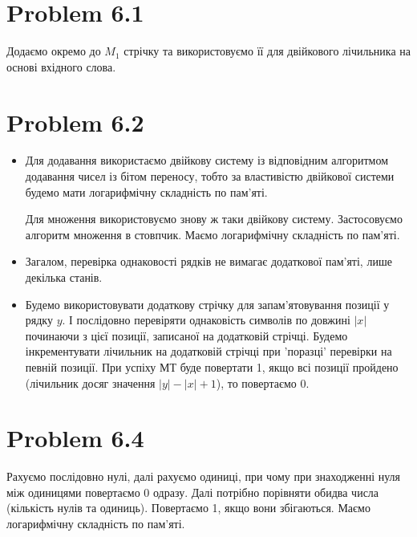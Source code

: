 \documentclass[12pt,letterpaper]{article}
\begin{document}
\section{Problem 6.1}
Додаємо окремо до $M_1$ стрічку та використовуємо її для двійкового лічильника на основі вхідного слова.

\section{Problem 6.2}
\begin{itemize}
    \item Для додавання використаємо двійкову систему із відповідним алгоритмом додавання чисел
із бітом переносу, тобто за властивістю двійкової системи будемо мати логарифмічну складність
по пам'яті.

Для множення використовуємо знову ж таки двійкову систему. Застосовуємо алгоритм множення
 в стовпчик. Маємо логарифмічну складність по пам'яті.
 \item  Загалом, перевірка однаковості рядків не вимагає додаткової пам'яті, лише декілька станів.
 \item Будемо використовувати додаткову стрічку для запам'ятовування позиції у рядку $y$. І послідовно перевіряти однаковість символів по довжині $|x|$ починаючи з цієї позиції, записаної на додатковій стрічці. Будемо інкрементувати лічильник на додатковій стрічці при 'поразці' перевірки на певній позиції. При успіху МТ буде повертати 1, якщо всі позиції пройдено (лічильник досяг значення $|y| - |x| + 1$), то повертаємо 0.

\end{itemize}





\section{Problem 6.4}

Рахуємо послідовно нулі, далі рахуємо одиниці, при чому при знаходженні нуля між одиницями
повертаємо 0 одразу. Далі потрібно порівняти обидва числа (кількість нулів та одиниць). Повертаємо
1, якщо вони збігаються. Маємо логарифмічну складність по пам'яті.

\end{document}
